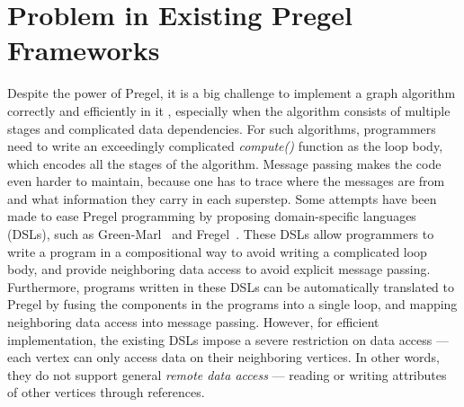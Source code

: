 \documentclass{sokendai_thesis} %
\begin{document}
\section{Problem in Existing Pregel Frameworks}

Despite the power of Pregel, it is a big challenge to implement a graph algorithm correctly and efficiently in it \cite{connectivity}, especially when the algorithm consists of multiple stages and complicated data dependencies.
For such algorithms, programmers need to write an exceedingly complicated \textit{compute()} function as the loop body, which encodes all the stages of the algorithm. %
Message passing makes the code even harder to maintain, because one has to trace where the messages are from and what information they carry in each superstep.
Some attempts have been made to ease Pregel programming by proposing domain-specific languages (DSLs), such as Green-Marl~\cite{green14} and Fregel~\cite{fregel}.
These DSLs allow programmers to write a program in a compositional way to avoid writing a complicated loop body, and provide neighboring data access to avoid explicit message passing.
Furthermore, programs written in these DSLs can be automatically translated to Pregel by fusing the components in the programs into a single loop, and mapping neighboring data access into message passing.
However, for efficient implementation, the existing DSLs impose a severe restriction on data access --- each vertex can only access data on their neighboring vertices.
In other words, they do not support general \emph{remote data access} --- reading or writing attributes of other vertices through references.

\end{document}
